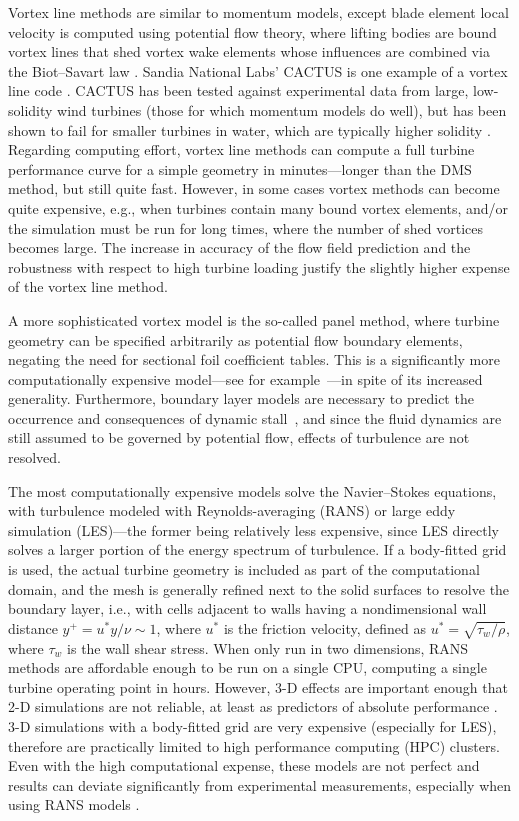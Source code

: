 Vortex line methods are similar to momentum models, except blade element local
velocity is computed using potential flow theory, where lifting bodies are bound
vortex lines that shed vortex wake elements whose influences are combined via
the Biot--Savart law \cite{Strickland1979}. Sandia National Labs' CACTUS is one
example of a vortex line code \cite{Murray2011}. CACTUS has been tested against
experimental data from large, low-solidity wind turbines (those for which
momentum models do well), but has been shown to fail for smaller turbines in
water, which are typically higher solidity \cite{Michelen2014}. Regarding
computing effort, vortex line methods can compute a full turbine performance
curve for a simple geometry in minutes---longer than the DMS method, but still
quite fast. However, in some cases vortex methods can become quite expensive,
e.g., when turbines contain many bound vortex elements, and/or the simulation
must be run for long times, where the number of shed vortices becomes large. The
increase in accuracy of the flow field prediction and the robustness with
respect to high turbine loading justify the slightly higher expense of the
vortex line method.

A more sophisticated vortex model is the so-called panel method, where turbine
geometry can be specified arbitrarily as potential flow boundary elements,
negating the need for sectional foil coefficient tables. This is a significantly
more computationally expensive model---see for example~\cite{Dixon2008}---in
spite of its increased generality. Furthermore, boundary layer models are
necessary to predict the occurrence and consequences of dynamic
stall~\cite{Zanon2012}, and since the fluid dynamics are still assumed to be
governed by potential flow, effects of turbulence are not resolved.

The most computationally expensive models solve the Navier--Stokes equations,
with turbulence modeled with Reynolds-averaging (RANS) or large eddy simulation
(LES)---the former being relatively less expensive, since LES directly solves a
larger portion of the energy spectrum of turbulence. If a body-fitted grid is
used, the actual turbine geometry is included as part of the computational
domain, and the mesh is generally refined next to the solid surfaces to resolve
the boundary layer, i.e., with cells adjacent to walls having a nondimensional
wall distance $y^+ = u^* y / \nu \sim 1$, where $u^*$ is the friction velocity,
defined as $u^*=\sqrt{\tau_w / \rho}$, where $\tau_w$ is the wall shear stress.
When only run in two dimensions, RANS methods are affordable enough to be run on
a single CPU, computing a single turbine operating point in hours. However, 3-D
effects are important enough that 2-D simulations are not reliable, at least as
predictors of absolute performance \cite{Li2013}. 3-D simulations with a
body-fitted grid are very expensive (especially for LES), therefore are
practically limited to high performance computing (HPC) clusters. Even with the
high computational expense, these models are not perfect and results can deviate
significantly from experimental measurements, especially when using RANS models
\cite{Li2013}.

